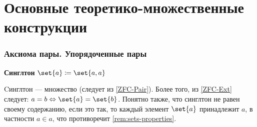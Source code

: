 \documentclass{article}
\begin{document}
\section{Основные теоретико-множественные конструкции}

\subsubsection{Аксиома пары. Упорядоченные пары}
    \begin{definition}
        \label{def:singleton}
        \textbf{Синглтон} \(\set{a} \coloneq \set{a, a}\)
    \end{definition}
    \begin{remark}
        \label{rem:singleton-properties}
        Cинглтон --- множество (следует из \ref{ZFC-Pair}).  Более того, из \ref{ZFC-Ext} следует: \(a = b \Leftrightarrow \set{a} = \set{b}\). Понятно также, что синглтон не равен своему содержанию, если это так, то каждый элемент \(\set{a}\) принадлежит \(a\), в частности \(a \in a\), что противоречит \ref{rem:sets-properties}.    
    \end{remark}
\end{document}
